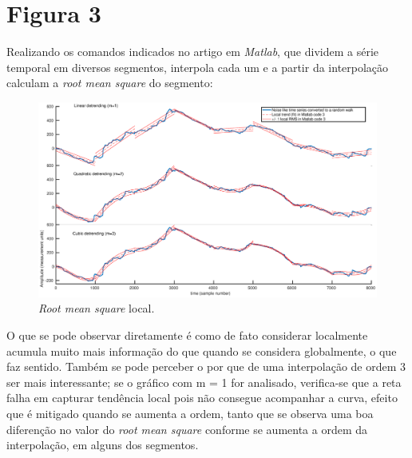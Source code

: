 \documentclass{article}[twocolumn]
\begin{document}
	\section{Figura 3}
	Realizando os comandos indicados no artigo em \textit{Matlab}, que dividem a s\'erie temporal
	em diversos segmentos, interpola cada um e a partir da interpola\c{c}\~ao calculam a
	\textit{root mean square} do segmento:
	\begin{figure}[H]
		\centering
		\includegraphics[width=12cm]{fig3.eps}
		\caption{\textit{Root mean square} local.}
	\end{figure}
	O que se pode observar diretamente \'e como de fato considerar localmente acumula muito
	mais informa\c{c}\~ao do que quando se considera globalmente, o que faz sentido. Tamb\'em
	se pode perceber o por que de uma interpola\c{c}\~ao de ordem 3 ser mais interessante; se
	o gr\'afico com m = 1 for analisado, verifica-se que a reta falha em capturar tend\^encia
	local pois n\~ao consegue acompanhar a curva, efeito que \'e mitigado quando se aumenta
	a ordem, tanto que se observa uma boa diferen\c{c}\~ao no valor do \textit{root mean
	square} conforme se aumenta a ordem da interpola\c{c}\~ao, em alguns dos segmentos.
\end{document}
